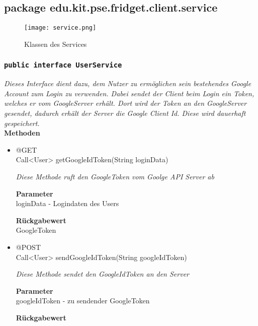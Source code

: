 
\subsection{package edu.kit.pse.fridget.client.service}
\begin{figure}[H]
	       \centering
	       \texttt{[image: service.png]}
	       \caption{Klassen des Services}
	      \end{figure}	
	\subsubsection{\texttt{public interface UserService}}
\textit{Dieses Interface dient dazu, dem Nutzer zu ermöglichen sein bestehendes Google Account zum Login zu verwenden. Dabei sendet der Client beim Login ein Token, welches er vom GoogleServer erhält. Dort wird der Token an den GoogleServer gesendet, dadurch erhält der Server die Google Client Id. Diese wird dauerhaft gespeichert.}\\

	\textbf{Methoden} \\
		\begin{itemize}
		\item{@GET\\ Call<User> getGoogleIdToken(String loginData)}

		\textit{Diese Methode ruft den GoogleToken vom Goolge API Server ab}

		\textbf{Parameter} \\
	loginData - Logindaten des Users

		\textbf{Rückgabewert} \\
	GoogleToken

      \item{@POST\\ Call<User> sendGoogleIdToken(String googleIdToken)}

		\textit{Diese Methode sendet den GoogleIdToken an den Server}

		\textbf{Parameter} \\
		googleIdToken - zu sendender GoogleToken

		\textbf{Rückgabewert} \\
	

	 \end{itemize}

